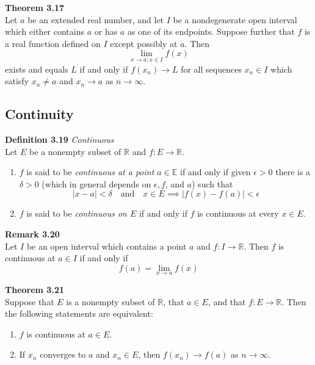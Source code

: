 \documentclass[8pt,landscape]{article}
\begin{document}
\begin{multicols}{3}
    \textbf{Theorem 3.17} \\
    Let $a$ be an extended real number, and let $I$ be a nondegenerate open interval which
    either contains $a$ or has $a$ as one of its endpoints.
    Suppose further that $f$ is a real function defined on $I$ except possibly at $a$.
    Then
    \[
        \lim_{x \to a; x \in I} f(x)
    \]
    exists and equals $L$ if and only if $f(x_n) \to L$ for all sequences $x_n \in I$
    which satisfy $x_n \neq a$ and $x_n \to a$ as $n \to \infty$.


    \subsection{Continuity}



    \textbf{Definition 3.19} \emph{Continuous} \\
    Let $E$ be a nonempty subset of $\mathbb{R}$ and $f : E \to \mathbb{R}$.
    \begin{enumerate}
        \item $f$ is said to be \emph{continuous at a point $a \in \mathbb{E}$} if and only
            if given $\epsilon > 0$ there is a $\delta > 0$
            (which in general depends on $\epsilon, f$, and $a$) such that
            \[
                |x-a| < \delta \quad \text{and} \quad x \in E \implies
                |f(x) - f(a)| < \epsilon
            \]
        \item $f$ is said to be \emph{continuous on $E$} if and only if $f$ is continuous
            at every $x \in E$.
    \end{enumerate}

    \textbf{Remark 3.20} \\
    Let $I$ be an open interval which contains a point $a$ and $f : I \to \mathbb{R}$.
    Then $f$ is continuous at $a \in I$ if and only if
    \[
        f(a) = \lim_{x \to a} f(x)
    \]

    \textbf{Theorem 3.21} \\
    Suppose that $E$ is a nonempty subset of $\mathbb{R}$, that $a \in E$, and that
    $f : E \to \mathbb{R}$.
    Then the following statements are equivalent:
    \begin{enumerate}
        \item $f$ is continuous at $a \in E$.
        \item If $x_n$ converges to $a$ and $x_n \in E$, then
            $f(x_n) \to f(a)$ as $n \to \infty$.
    \end{enumerate}


\end{multicols}
\end{document}
